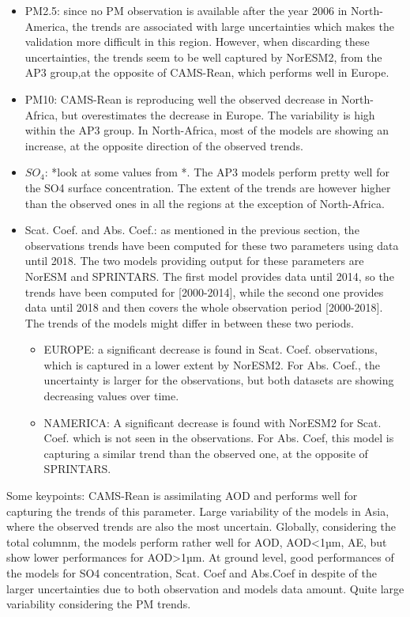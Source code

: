 \documentclass[journal abbreviation, manuscript]{copernicus}
\begin{document}
\begin{itemize}
 \item PM2.5: since no PM observation is available after the year 2006 in North-America, the trends are associated with large uncertainties which makes the validation more difficult in this region. However, when discarding these uncertainties, the trends seem to be well captured by NorESM2, from the AP3 group,at the opposite of CAMS-Rean, which performs well in Europe.
 \item PM10: CAMS-Rean is reproducing well the observed decrease in North-Africa, but overestimates the decrease in Europe. The variability is high within the AP3 group. In North-Africa, most of the models are showing an increase, at the opposite direction of the observed trends.
 \item $SO_{4}$: *look at some values from \cite{aas2019global}*. The AP3 models perform pretty well for the SO4 surface concentration. The extent of the trends are however higher than the observed ones in all the regions at the exception of North-Africa.
 \item Scat. Coef. and Abs. Coef.: as mentioned in the previous section, the observations trends have been computed for these two parameters using data until 2018. The two models providing output for these parameters are NorESM and SPRINTARS. The first model provides data until 2014, so the trends have been computed for [2000-2014], while the second one provides data until 2018 and then covers the whole observation period [2000-2018]. The trends of the models might differ in between these two periods.
       \begin{itemize}
        \item EUROPE: a significant decrease is found in Scat. Coef. observations, which is captured in a lower extent by NorESM2. For Abs. Coef., the uncertainty is larger for the observations, but both datasets are showing decreasing values over time.
        \item NAMERICA: A significant decrease is found with NorESM2 for Scat. Coef. which is not seen in the observations. For Abs. Coef, this model is capturing a similar trend than the observed one, at the opposite of SPRINTARS.
       \end{itemize}
\end{itemize}

Some keypoints:
CAMS-Rean is assimilating AOD and performs well for capturing the trends of this parameter.
Large variability of the models in Asia, where the observed trends are also the most uncertain.
Globally, considering the total columnm, the models perform rather well for AOD, AOD<1µm, AE, but show lower performances for AOD>1µm. At ground level, good performances of the models for SO4 concentration, Scat. Coef and Abs.Coef in despite of the larger uncertainties due to both observation and models data amount. Quite large variability considering the PM trends.
\end{document}
